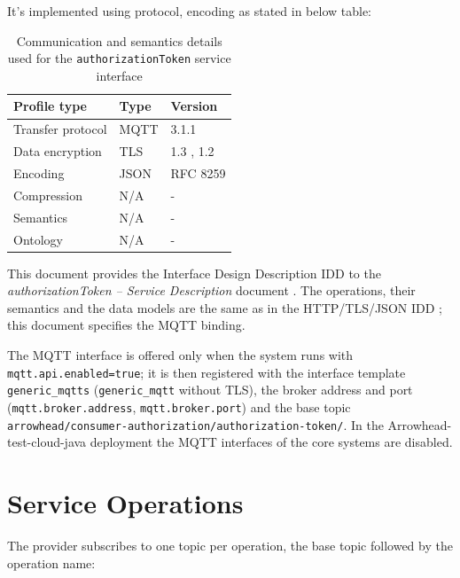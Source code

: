 \documentclass[a4paper]{arrowhead}
\begin{document}
It's implemented using protocol, encoding as stated in below table:
\begin{table}[ht!]
  \centering
  \begin{tabular}{|l|l|l|}
    \hline
    \rowcolor{gray!33} Profile type & Type & Version \\ \hline
    Transfer protocol & MQTT & 3.1.1 \cite{mqtt311} \\ \hline
    Data encryption & TLS & 1.3 \cite{rfc8446}, 1.2 \cite{rfc5246} \\ \hline
    Encoding & JSON & RFC 8259 \cite{rfc8259} \\ \hline
    Compression & N/A & - \\ \hline
    Semantics & N/A & - \\ \hline
    Ontology & N/A & - \\ \hline
  \end{tabular}
  \caption{Communication and semantics details used for the \texttt{authorizationToken} service interface}
  \label{tab:comunication_semantics_profile}
\end{table}

This document provides the Interface Design Description IDD to the \textit{authorizationToken -- Service Description} document \cite{ca-authorizationToken-sd}.
The operations, their semantics and the data models are the same as in the HTTP/TLS/JSON IDD \cite{ca-authorizationToken-http-idd}; this document specifies the MQTT binding.

The MQTT interface is offered only when the system runs with \texttt{mqtt.api.enabled=true}; it is then registered with the interface template \texttt{generic\_\allowbreak{}mqtts} (\texttt{generic\_\allowbreak{}mqtt} without TLS), the broker address and port (\texttt{mqtt.\allowbreak{}broker.\allowbreak{}address}, \texttt{mqtt.\allowbreak{}broker.\allowbreak{}port}) and the base topic \texttt{arrowhead/\allowbreak{}consumer-\allowbreak{}authorization/\allowbreak{}authorization-\allowbreak{}token/\allowbreak{}}. In the Arrowhead-test-cloud-java deployment the MQTT interfaces of the core systems are disabled.

\newpage

\section{Service Operations}
\label{sec:operations}

The provider subscribes to one topic per operation, the base topic followed by the operation name:
\end{document}
